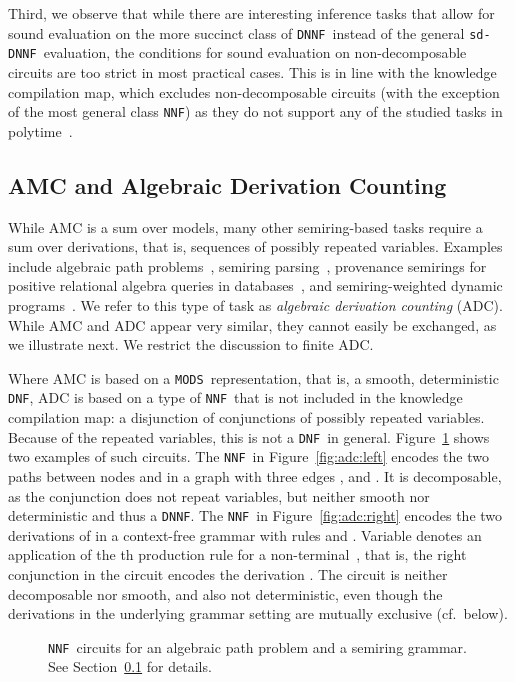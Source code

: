 \documentclass{article}
\theoremstyle{plain}
\theoremstyle{definition}
\newcommand{\NNF}{{\tt NNF}}
\newcommand{\DNF}{{\tt DNF}}
\newcommand{\DNNF}{{\tt DNNF}}
\newcommand{\sdDNNF}{{\tt sd-DNNF}}
\newcommand{\MODS}{{\tt MODS}}
\begin{document}
Third, we observe that while there are interesting inference tasks
that allow for sound evaluation on the more succinct class of \DNNF\
instead of the general \sdDNNF\ evaluation, the conditions for sound
evaluation on non-decomposable circuits are too strict in most
practical cases. 
This is in line with the knowledge compilation map,
which excludes non-decomposable circuits (with the exception of the
most general class \NNF) as they do not support any of the 
studied tasks in polytime~\citep{darwiche2002knowledge}. 


\subsection{AMC and Algebraic Derivation Counting}\label{sec:amcapp}
While AMC is a sum over models, many other semiring-based tasks
require a 
sum over derivations, that is, sequences of possibly repeated variables. Examples include 
algebraic path
problems~\citep{baras2010path}, semiring
parsing~\citep{Goodman99}, provenance semirings for positive
relational algebra queries in databases~\citep{Green2007}, and
semiring-weighted dynamic programs~\citep{Eisner05}. 
We refer to this type of task as \emph{algebraic derivation
  counting} (ADC). While AMC and ADC appear very similar, they cannot
easily be exchanged, as we illustrate next. We restrict the
discussion to finite ADC.

Where AMC is based on a \MODS\ representation, that is, a smooth,
deterministic \DNF, ADC is based on a type of \NNF\ that is not
included in the knowledge compilation map: a disjunction of
conjunctions  of possibly repeated variables. Because of the repeated
variables, this is not a \DNF\ in general.   Figure~\ref{fig:adc}
shows two examples of such circuits. The \NNF\ in Figure~\ref{fig:adc:left} encodes the two paths between
nodes  and  in a graph with three edges ,  and
. It  is decomposable, as the conjunction does not repeat
variables, but neither smooth nor deterministic and thus a \DNNF. The \NNF\ in Figure~\ref{fig:adc:right} encodes the two derivations of  in a context-free grammar
with rules  and . Variable  denotes an application of 
the th production rule for a non-terminal~, that is, the right
conjunction in the circuit encodes the derivation . 
The circuit  is neither decomposable nor smooth, and  also not
deterministic, even though the derivations in the underlying grammar
setting are mutually exclusive (cf.~below). 

\begin{figure}
\center
{}
\caption{\NNF\ circuits for an algebraic path problem and a
  semiring grammar. See Section~\ref{sec:amcapp} for details.}
\label{fig:adc}
\end{figure} 
\end{document}
